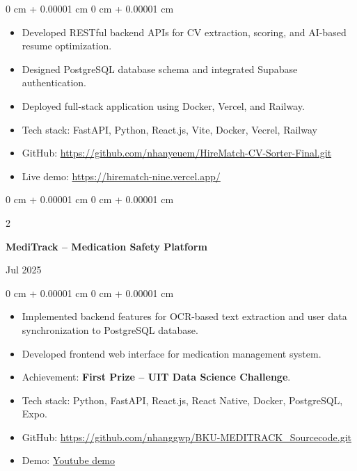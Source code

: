 \documentclass[10pt, letterpaper]{article}
\newenvironment{highlights}{
    \begin{itemize}[
        topsep=0.10 cm,
        parsep=0.10 cm,
        partopsep=0pt,
        itemsep=0pt,
        leftmargin=0 cm + 10pt
    ]
}
{
    \end{itemize}
}
\newenvironment{onecolentry}{
    \begin{adjustwidth}{
        0 cm + 0.00001 cm
    }{
        0 cm + 0.00001 cm
    }
}
{
    \end{adjustwidth}
}
\newenvironment{twocolentry}[2][]{
    \onecolentry
    \def\secondColumn{#2}
    \setcolumnwidth{\fill, 4.5 cm}
    \begin{paracol}{2}
}
{
    \switchcolumn \raggedleft \secondColumn
    \end{paracol}
    \endonecolentry
}
\begin{document}
\vspace{0.10 cm}
\begin{onecolentry}
    \begin{highlights}
     \item Developed RESTful backend APIs for CV extraction, scoring, and AI-based resume optimization.
\item Designed PostgreSQL database schema and integrated Supabase authentication.
\item Deployed full-stack application using Docker, Vercel, and Railway.
        \item  Tech stack: FastAPI, Python, React.js, Vite, Docker, Vecrel, Railway
        \item GitHub: \href{https://github.com/nhanyeuem/HireMatch-CV-Sorter-Final.git}{https://github.com/nhanyeuem/HireMatch-CV-Sorter-Final.git}
        \item Live demo: \href{https://hirematch-nine.vercel.app/}{https://hirematch-nine.vercel.app/}
    \end{highlights}
\end{onecolentry}



\vspace{0.1 cm}


\begin{twocolentry}{
Jul 2025
}
    \textbf{MediTrack – Medication Safety Platform}
\end{twocolentry}

\vspace{0.10 cm}
\begin{onecolentry}
    \begin{highlights}
        \item Implemented backend features for OCR-based text extraction and user data synchronization to PostgreSQL database.
        \item Developed frontend web interface for medication management system.
        \item Achievement: \textbf{First Prize – UIT Data Science Challenge}.
        \item Tech stack: Python, FastAPI, React.js, React Native, Docker, PostgreSQL, Expo.
\item GitHub: \href{https://github.com/nhanggwp/BKU-MEDITRACK\_Sourcecode.git}{https://github.com/nhanggwp/BKU-MEDITRACK\_Sourcecode.git}
\item  Demo: \href{https://www.youtube.com/watch?v=kP5NGEErnXY}{Youtube demo}
    \end{highlights}
\end{onecolentry}
\vspace{0.1 cm}
\end{document}
